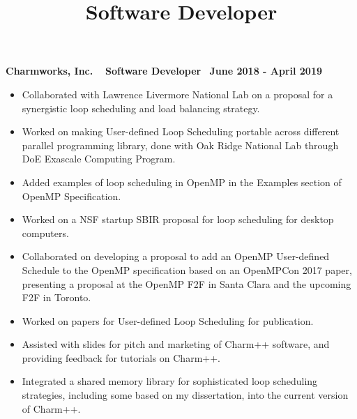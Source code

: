 \title{Software Developer}
\textbf{Charmworks, Inc. $\>$$\>$$\>$$\>$Software Developer$\>$$\>$$\>$$\>$June 2018 - April 2019}
\vspace{0.0in}
\begin{itemize}
\item Collaborated with Lawrence Livermore National Lab on a proposal for a synergistic loop scheduling and load balancing strategy.
\item Worked on making User-defined Loop Scheduling portable across different parallel programming library, done with Oak Ridge National Lab through DoE Exascale Computing Program.
\item Added examples of loop scheduling in OpenMP in the Examples section of OpenMP Specification.
\item Worked on a NSF startup SBIR proposal for loop scheduling for desktop computers.
\item Collaborated on developing a proposal to add an OpenMP User-defined Schedule to the OpenMP specification based on an OpenMPCon 2017 paper, presenting a proposal at the OpenMP F2F in Santa Clara and the upcoming F2F in Toronto.
\item Worked on papers for User-defined Loop Scheduling for publication.
\item Assisted with slides for pitch and marketing of Charm++ software, and providing feedback for tutorials on Charm++.
\item Integrated a shared memory library for sophisticated loop scheduling strategies, including some based on my dissertation, into the current version of Charm++.
\end{itemize}



